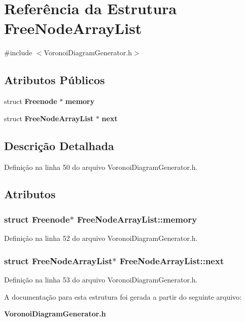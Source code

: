 \section{Referência da Estrutura Free\+Node\+Array\+List}
\label{struct_free_node_array_list}


{\ttfamily \#include $<$Voronoi\+Diagram\+Generator.\+h$>$}

\subsection*{Atributos Públicos}
\begin{DoxyCompactItemize}
\item 
struct {\bf Freenode} $\ast$ {\bf memory}
\item 
struct {\bf Free\+Node\+Array\+List} $\ast$ {\bf next}
\end{DoxyCompactItemize}


\subsection{Descrição Detalhada}


Definição na linha 50 do arquivo Voronoi\+Diagram\+Generator.\+h.



\subsection{Atributos}
\subsubsection[{memory}]{\setlength{\rightskip}{0pt plus 5cm}struct {\bf Freenode}$\ast$ Free\+Node\+Array\+List\+::memory}\label{struct_free_node_array_list_a47c89d1dce5406d12613bea6ec2818d4}


Definição na linha 52 do arquivo Voronoi\+Diagram\+Generator.\+h.

\subsubsection[{next}]{\setlength{\rightskip}{0pt plus 5cm}struct {\bf Free\+Node\+Array\+List}$\ast$ Free\+Node\+Array\+List\+::next}\label{struct_free_node_array_list_a8b41b1d2d224f6a31a6ffdff0ccbd086}


Definição na linha 53 do arquivo Voronoi\+Diagram\+Generator.\+h.



A documentação para esta estrutura foi gerada a partir do seguinte arquivo\+:\begin{DoxyCompactItemize}
\item 
{\bf Voronoi\+Diagram\+Generator.\+h}\end{DoxyCompactItemize}
